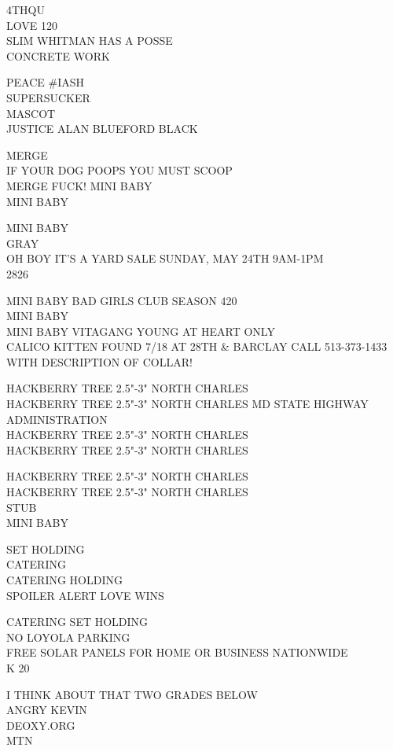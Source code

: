 \documentclass[10pt,letterpaper]{article}
\begin{document}
4THQU\\
LOVE 120\\
SLIM WHITMAN HAS A POSSE\\
CONCRETE WORK

PEACE \#IASH\\
SUPERSUCKER\\
MASCOT\\
JUSTICE ALAN BLUEFORD BLACK

MERGE\\
IF YOUR DOG POOPS YOU MUST SCOOP\\
MERGE FUCK! MINI BABY\\
MINI BABY

MINI BABY\\
GRAY\\
OH BOY IT'S A YARD SALE SUNDAY, MAY 24TH 9AM{-}1PM\\
2826

MINI BABY BAD GIRLS CLUB SEASON 420\\
MINI BABY\\
MINI BABY VITAGANG YOUNG AT HEART ONLY\\
CALICO KITTEN FOUND 7/18 AT 28TH \& BARCLAY CALL 513{-}373{-}1433 WITH DESCRIPTION OF COLLAR!

HACKBERRY TREE 2.5"{-}3" NORTH CHARLES\\
HACKBERRY TREE 2.5"{-}3" NORTH CHARLES MD STATE HIGHWAY ADMINISTRATION\\
HACKBERRY TREE 2.5"{-}3" NORTH CHARLES\\
HACKBERRY TREE 2.5"{-}3" NORTH CHARLES

HACKBERRY TREE 2.5"{-}3" NORTH CHARLES\\
HACKBERRY TREE 2.5"{-}3" NORTH CHARLES\\
STUB\\
MINI BABY

SET HOLDING\\
CATERING\\
CATERING HOLDING\\
SPOILER ALERT LOVE WINS

CATERING SET HOLDING\\
NO LOYOLA PARKING\\
FREE SOLAR PANELS FOR HOME OR BUSINESS NATIONWIDE\\
K 20

I THINK ABOUT THAT TWO GRADES BELOW\\
ANGRY KEVIN\\
DEOXY.ORG\\
MTN
\end{document}
